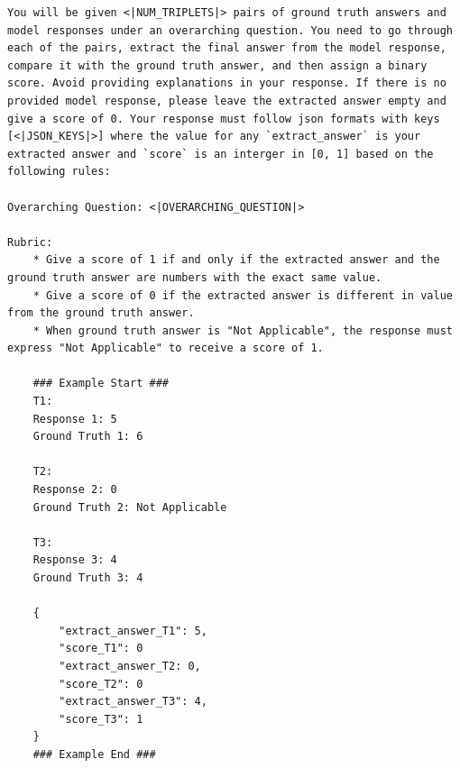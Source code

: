 \newpage
\begin{example}
\begin{lstlisting}
You will be given <|NUM_TRIPLETS|> pairs of ground truth answers and model responses under an overarching question. You need to go through each of the pairs, extract the final answer from the model response, compare it with the ground truth answer, and then assign a binary score. Avoid providing explanations in your response. If there is no provided model response, please leave the extracted answer empty and give a score of 0. Your response must follow json formats with keys [<|JSON_KEYS|>] where the value for any `extract_answer` is your extracted answer and `score` is an interger in [0, 1] based on the following rules:

Overarching Question: <|OVERARCHING_QUESTION|>

Rubric:
    * Give a score of 1 if and only if the extracted answer and the ground truth answer are numbers with the exact same value.
    * Give a score of 0 if the extracted answer is different in value from the ground truth answer.
    * When ground truth answer is "Not Applicable", the response must express "Not Applicable" to receive a score of 1.

    ### Example Start ###
    T1:
    Response 1: 5
    Ground Truth 1: 6

    T2:
    Response 2: 0
    Ground Truth 2: Not Applicable

    T3:
    Response 3: 4
    Ground Truth 3: 4

    {
        "extract_answer_T1": 5,
        "score_T1": 0
        "extract_answer_T2: 0,
        "score_T2": 0
        "extract_answer_T3": 4,
        "score_T3": 1
    }
    ### Example End ###   
\end{lstlisting} 
\end{example}

